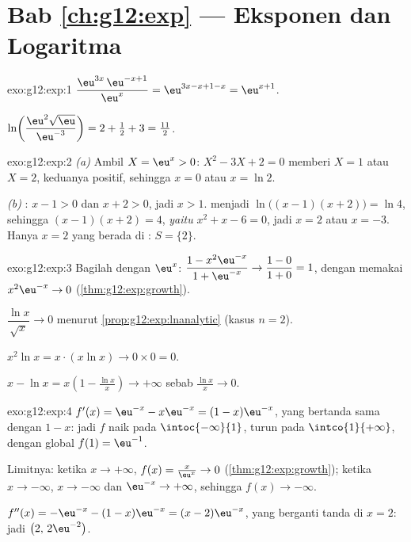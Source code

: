 \section*{Bab \ref{ch:g12:exp} --- Eksponen dan Logaritma}

\begin{solution}{exo:g12:exp:1}
$\dfrac{\eu^{3x}\,\eu^{-x+1}}{\eu^{x}} = \eu^{3x - x + 1 - x} = \eu^{x+1}$.

$\ln\!\left(\dfrac{\eu^2\sqrt{\eu}}{\eu^{-3}}\right)
= 2 + \tfrac12 + 3 = \tfrac{11}{2}$.
\end{solution}

\begin{solution}{exo:g12:exp:2}
\emph{(a)} Ambil $X = \eu^x > 0$: $X^2 - 3X + 2 = 0$ memberi $X = 1$ atau
$X = 2$, keduanya positif, sehingga $x = 0$ atau $x = \ln 2$.

\emph{(b)} : $x - 1 > 0$ dan $x + 2 > 0$, jadi $x > 1$.
 menjadi $\ln\bigl((x-1)(x+2)\bigr) = \ln 4$, sehingga
$(x-1)(x+2) = 4$, \emph{yaitu} $x^2 + x - 6 = 0$, jadi $x = 2$ atau $x = -3$.
Hanya $x = 2$ yang berada di : $S = \{2\}$.
\end{solution}

\begin{solution}{exo:g12:exp:3}
Bagilah dengan $\eu^x$:
$\dfrac{1 - x^2\eu^{-x}}{1 + \eu^{-x}} \to \dfrac{1-0}{1+0} = 1$, dengan
memakai $x^2 \eu^{-x} \to 0$ (\cref{thm:g12:exp:growth}).

$\dfrac{\ln x}{\sqrt x} \to 0$ menurut \cref{prop:g12:exp:lnanalytic} (kasus
$n = 2$).

$x^2 \ln x = x \cdot (x \ln x) \to 0 \times 0 = 0$.

$x - \ln x = x\left(1 - \frac{\ln x}{x}\right) \to +\infty$ sebab
$\frac{\ln x}{x} \to 0$.
\end{solution}

\begin{solution}{exo:g12:exp:4}
$f'(x) = \eu^{-x} - x\eu^{-x} = (1 - x)\eu^{-x}$, yang bertanda sama dengan
$1 - x$: jadi $f$ naik pada $\intoc{-\infty}{1}$, turun pada
$\intco{1}{+\infty}$, dengan  global $f(1) = \eu^{-1}$.

Limitnya: ketika $x \to +\infty$, $f(x) = \frac{x}{\eu^x} \to 0$
(\cref{thm:g12:exp:growth}); ketika $x \to -\infty$, $x \to -\infty$ dan
$\eu^{-x} \to +\infty$, sehingga $f(x) \to -\infty$.

$f''(x) = -\eu^{-x} - (1-x)\eu^{-x} = (x - 2)\eu^{-x}$, yang berganti tanda di
$x = 2$: jadi  $\bigl(2,\, 2\eu^{-2}\bigr)$.
\end{solution}

